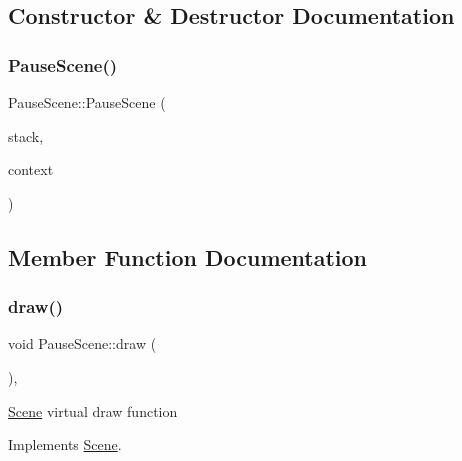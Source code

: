 \subsection{Constructor \& Destructor Documentation}
\mbox{\label{class_pause_scene_a65ac2aa9fca0b1027481e60417749c4f}} 
\subsubsection{\texorpdfstring{Pause\+Scene()}{PauseScene()}}
{\footnotesize\ttfamily Pause\+Scene\+::\+Pause\+Scene (\begin{DoxyParamCaption}\item[{\hyperlink{class_scene_stack}{Scene\+Stack} \&}]{stack,  }\item[{\hyperlink{struct_scene_1_1_context}{Context}}]{context }\end{DoxyParamCaption})}



\subsection{Member Function Documentation}
\mbox{\label{class_pause_scene_abfd1398a064a83b3ae6ac5fd98aebf05}} 
\subsubsection{\texorpdfstring{draw()}{draw()}}
{\footnotesize\ttfamily void Pause\+Scene\+::draw (\begin{DoxyParamCaption}{ }\end{DoxyParamCaption})\hspace{0.3cm}{\ttfamily [override]}, {\ttfamily [virtual]}}

\hyperlink{class_scene}{Scene} virtual draw function 

Implements \hyperlink{class_scene_a789c16961aa1e316b2a4a05b95187546}{Scene}.

\mbox{\label{class_pause_scene_adeb06e37e0a2afa297ddbe795c3cbe94}} 
